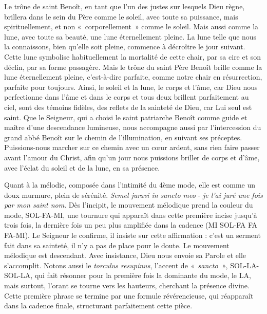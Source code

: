 \documentclass[Session2026.tex]{subfiles}
\begin{document}
Le trône de saint Benoît, en tant que l'un des justes sur lesquels Dieu
règne, brillera dans le sein du Père comme le soleil, avec toute sa
puissance, mais spirituellement, et non «~corporellement~» comme le
soleil. Mais aussi comme la lune, avec toute sa beauté, une lune
éternellement pleine. La lune telle que nous la connaissons, bien
qu'elle soit pleine, commence à décroître le jour suivant. Cette lune
symbolise habituellement la mortalité de cette chair, par sa cire et son
déclin, par sa forme passagère. Mais le trône du saint Père Benoît
brille comme la lune éternellement pleine, c'est-à-dire parfaite, comme
notre chair en résurrection, parfaite pour toujours. Ainsi, le soleil et
la lune, le corps et l'âme, car Dieu nous perfectionne dans l'âme et
dans le corps et tous deux brillent parfaitement au ciel, sont des
témoins fidèles, des reflets de la sainteté de Dieu, car Lui seul est
saint. Que le Seigneur, qui a choisi le saint patriarche Benoît comme
guide et maître d'une descendance lumineuse, nous accompagne aussi par
l'intercession du grand abbé Benoît sur le chemin de l'illumination, en
suivant ses préceptes. Puissions-nous marcher sur ce chemin avec un cœur
ardent, sans rien faire passer avant l'amour du Christ, afin qu'un jour
nous puissions briller de corps et d'âme, avec l'éclat du soleil et de
la lune, en sa présence.

Quant à la mélodie, composée dans l'intimité du 4ème mode, elle est
comme un doux murmure, plein de sérénité. \emph{Semel juravi in sancto
meo} - \emph{je l'ai juré une fois par mon saint nom}. Dès l'incipit, le
mouvement mélodique prend la couleur du mode, SOL-FA-MI, une tournure
qui apparaît dans cette première incise jusqu'à trois fois, la dernière
fois un peu plus amplifiée dans la cadence (MI SOL-FA FA FA-MI). Le
Seigneur le confirme, il insiste sur cette affirmation : c'est un
serment fait dans sa sainteté, il n'y a pas de place pour le doute. Le
mouvement mélodique est descendant. Avec insistance, Dieu nous envoie sa
Parole et elle s'accomplit. Notons aussi le \emph{torculus resupinus},
l'accent de \emph{«~sancto~»}, SOL-LA-SOL-LA, qui fait résonner pour la
première fois la dominante du mode, le LA, mais surtout, l'orant se
tourne vers les hauteurs, cherchant la présence divine. Cette première
phrase se termine par une formule révérencieuse, qui réapparaît dans la
cadence finale, structurant parfaitement cette pièce.
\end{document}
